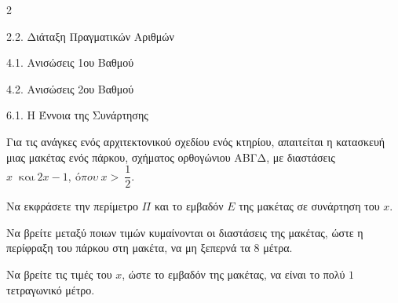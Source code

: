 \begin{ylh}{2}
    \item 2.2. Διάταξη Πραγματικών Αριθμών
    \item 4.1. Ανισώσεις 1ου Βαθμού
    \item 4.2. Ανισώσεις 2ου Βαθμού
    \item 6.1. Η Έννοια της Συνάρτησης
\end{ylh}
Για τις ανάγκες ενός αρχιτεκτονικού σχεδίου ενός κτηρίου, απαιτείται η κατασκευή μιας μακέτας ενός πάρκου, σχήματος ορθογώνιου ΑΒΓΔ, με διαστάσεις $x\ \text{ και}\ 2x - 1,\ ό\pi ο\upsilon\ x > \ \dfrac{1}{2}.$

\begin{alist}
\item Να εκφράσετε την περίμετρο $\Pi$ και το εμβαδόν $E$ της μακέτας σε συνάρτηση του $x$.

\item Να βρείτε μεταξύ ποιων τιμών κυμαίνονται οι διαστάσεις της μακέτας, ώστε η περίφραξη του πάρκου στη μακέτα, να μη ξεπερνά τα $8$ μέτρα.
\item Να βρείτε τις τιμές του $x$, ώστε το εμβαδόν της μακέτας, να είναι το πολύ $1$ τετραγωνικό μέτρο.
\end{alist}

